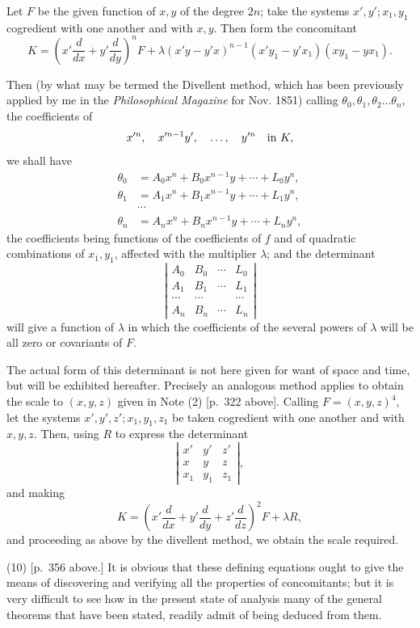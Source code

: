 \documentclass[11pt]{article}
\newcommand{\sourcepage}[1]{\marginpar{\scriptsize p.~#1}}
\begin{document}
{{Let $F$ be the given function of $x,y$ of the degree $2n$; take the systems $x',y';x_1,y_1$ cogredient with one another and with $x,y$. Then form the concomitant
\[
K=\left(x'\frac{d}{dx}+y'\frac{d}{dy}\right)^nF+
\lambda(x'y-y'x)^{n-1}(x'y_1-y'x_1)(xy_1-yx_1).
\]

\sourcepage{361}
Then (by what may be termed the Divellent method, which has been previously applied by me in the \emph{Philosophical Magazine} for Nov. 1851) calling $\theta_0,\theta_1,\theta_2\ldots\theta_n$, the coefficients of
\[
x'^n,
\quad x'^{n-1}y',
\quad \ldots,
\quad y'^n
\quad\hbox{in }K,
\]
we shall have
\[
\begin{aligned}
\theta_0&=A_0x^n+B_0x^{n-1}y+\cdots+L_0y^n,\\
\theta_1&=A_1x^n+B_1x^{n-1}y+\cdots+L_1y^n,\\
&\cdots\\
\theta_n&=A_nx^n+B_nx^{n-1}y+\cdots+L_ny^n,
\end{aligned}
\]
the coefficients being functions of the coefficients of $f$ and of quadratic combinations of $x_1,y_1$, affected with the multiplier $\lambda$; and the determinant
\[
\left|\begin{array}{cccc}
A_0&B_0&\cdots&L_0\\
A_1&B_1&\cdots&L_1\\
\cdots&\cdots&&\cdots\\
A_n&B_n&\cdots&L_n
\end{array}\right|
\]
will give a function of $\lambda$ in which the coefficients of the several powers of $\lambda$ will be all zero or covariants of $F$.

The actual form of this determinant is not here given for want of space and time, but will be exhibited hereafter. Precisely an analogous method applies to obtain the scale to $(x,y,z)$ given in Note (2) [p.~322 above]. Calling $F=(x,y,z)^4$, let the systems $x',y',z';x_1,y_1,z_1$ be taken cogredient with one another and with $x,y,z$. Then, using $R$ to express the determinant
\[
\left|\begin{array}{ccc}
x'&y'&z'\\
x&y&z\\
x_1&y_1&z_1
\end{array}\right|,
\]
and making
\[
K=\left(x'\frac{d}{dx}+y'\frac{d}{dy}+z'\frac{d}{dz}\right)^2F+\lambda R,
\]
and proceeding as above by the divellent method, we obtain the scale required.

(10) [p.~356 above.] It is obvious that these defining equations ought to give the means of discovering and verifying all the properties of concomitants; but it is very difficult to see how in the present state of analysis many of the general theorems that have been stated, readily admit of being deduced from them.

}}
\end{document}
